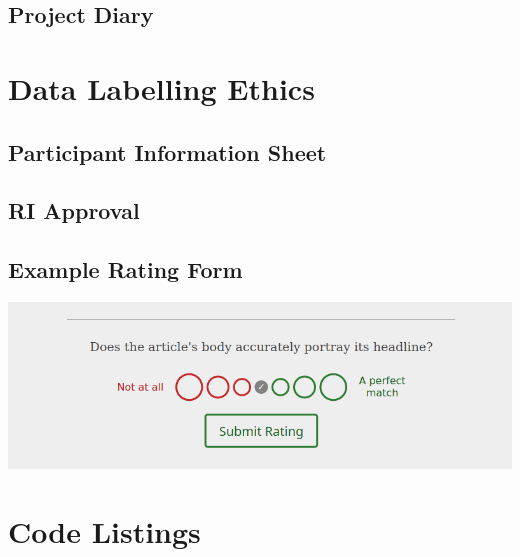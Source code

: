 \documentclass[12pt,a4paper]{article}
\begin{document}
\begin{appendices}
\begin{subappendices}
\subsection{Project Diary}\label{app:diary}





\fi

\end{subappendices}
\section{Data Labelling Ethics}


\begin{subappendices}
\subsection{Participant Information Sheet} \label{app:ethics-participant-info}


\subsection{RI Approval} \label{app:ethics-approval}






\subsection{Example Rating Form} \label{app:rating-form}
\includegraphics[scale=0.5]{../docs/ethics/example_rating-just-form}
\end{subappendices}

\section{Code Listings}
\begin{subappendices}

\end{subappendices}
\end{appendices}
\end{document}
